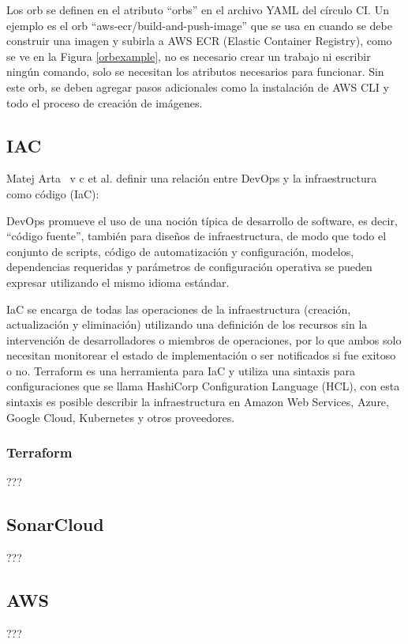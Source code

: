 Los orb se definen en el atributo ``orbs'' en el archivo YAML del círculo CI. Un ejemplo es el orb ``aws-ecr/build-and-push-image'' que se usa en cuando se debe construir una imagen y subirla a AWS ECR (Elastic Container Registry), como se ve en la Figura \ref{orbexample}, no es necesario crear un trabajo ni escribir ningún comando, solo se necesitan los atributos necesarios para funcionar. Sin este orb, se deben agregar pasos adicionales como la instalación de AWS CLI y todo el proceso de creación de imágenes.

\subsection {IAC}

Matej Arta \ v {c} et al. definir una relación entre DevOps y la infraestructura como código (IaC):

\relax
{}\relax

DevOps promueve el uso de una noción típica de desarrollo de software, es decir, ``código fuente'', también para diseños de infraestructura, de modo que todo el conjunto de scripts, código de automatización y configuración, modelos, dependencias requeridas y parámetros de configuración operativa se pueden expresar utilizando el mismo idioma estándar. \cite{devopsiac}

\relax
{}\relax

IaC se encarga de todas las operaciones de la infraestructura (creación, actualización y eliminación) utilizando una definición de los recursos sin la intervención de desarrolladores o miembros de operaciones, por lo que ambos solo necesitan monitorear el estado de implementación o ser notificados si fue exitoso o no.
Terraform \cite{terraform} es una herramienta para IaC y utiliza una sintaxis para configuraciones que se llama HashiCorp Configuration Language (HCL), con esta sintaxis es posible describir la infraestructura en Amazon Web Services, Azure, Google Cloud, Kubernetes y otros proveedores.

\subsubsection {Terraform}
???
\subsection {SonarCloud}
???
\subsection {AWS}
???
